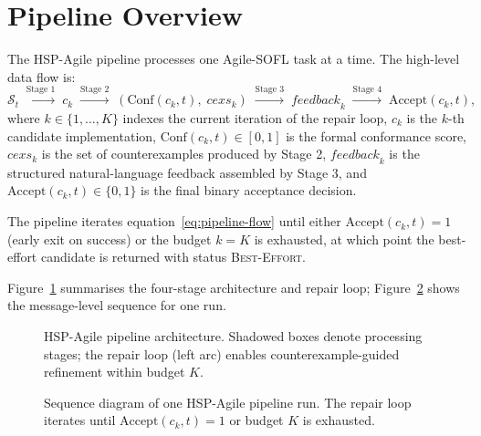 \section{Pipeline Overview}
\label{sec:method:overview}

The HSP-Agile pipeline processes one Agile-SOFL task at a time.  The
high-level data flow is:
\begin{equation}
  \mathcal{S}_t
  \;\xrightarrow{\text{Stage 1}}\;
  c_k
  \;\xrightarrow{\text{Stage 2}}\;
  (\mathrm{Conf}(c_k,t),\;\mathit{cexs}_k)
  \;\xrightarrow{\text{Stage 3}}\;
  \mathit{feedback}_k
  \;\xrightarrow{\text{Stage 4}}\;
  \mathrm{Accept}(c_k,t),
  \label{eq:pipeline-flow}
\end{equation}
where $k \in \{1,\ldots,K\}$ indexes the current iteration of the repair
loop, $c_k$ is the $k$-th candidate implementation, $\mathrm{Conf}(c_k,t) \in
[0,1]$ is the formal conformance score, $\mathit{cexs}_k$ is the set of
counterexamples produced by Stage 2, $\mathit{feedback}_k$ is the structured
natural-language feedback assembled by Stage 3, and $\mathrm{Accept}(c_k,t)
\in \{0,1\}$ is the final binary acceptance decision.

The pipeline iterates equation~\eqref{eq:pipeline-flow} until either
$\mathrm{Accept}(c_k, t) = 1$ (early exit on success) or the budget $k = K$
is exhausted, at which point the best-effort candidate is returned with status
\textsc{Best-Effort}.

Figure~\ref{fig:pipeline-arch} summarises the four-stage architecture and
repair loop; Figure~\ref{fig:pipeline-seq} shows the message-level sequence
for one run.

\begin{figure}[t]
  \centering
  \caption{HSP-Agile pipeline architecture.  Shadowed boxes denote
           processing stages; the repair loop (left arc) enables
           counterexample-guided refinement within budget $K$.}
  \label{fig:pipeline-arch}
\end{figure}

\begin{figure}[t]
  \centering
  \caption{Sequence diagram of one HSP-Agile pipeline run.  The
           repair loop iterates until $\mathrm{Accept}(c_k,t) = 1$ or
           budget $K$ is exhausted.}
  \label{fig:pipeline-seq}
\end{figure}

